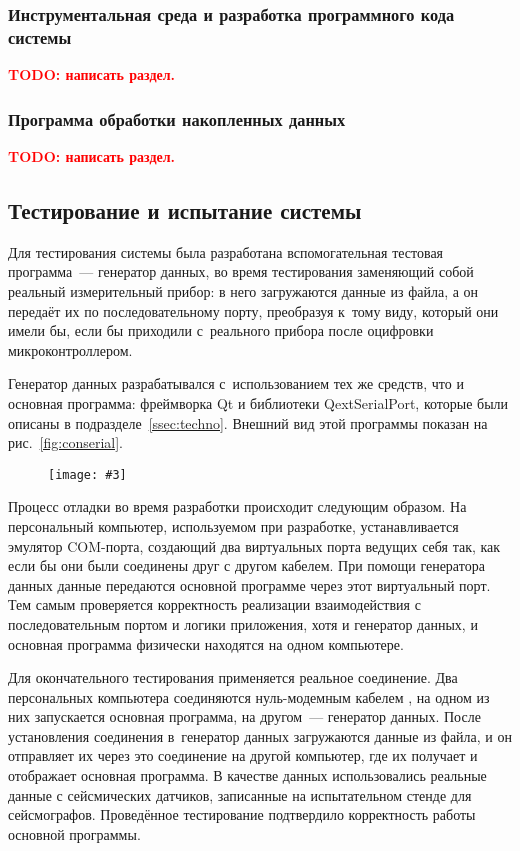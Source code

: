 \documentclass[a4paper, 14pt, titlepage]{extarticle}
\newcommand{\todo}[1]{\textbf{\textcolor{red}{TODO: #1}}}
\newenvironment{myfigure}[2]%
    {\pushQED{\caption{#1} \label{#2}} %
     \begin{figure}[!htb]\centering } %
    {  \popQED %
     \end{figure}}
\newcommand{\includefigure}[3][]{
    \begin{myfigure}{#2}{fig:#3}
      \texttt{[image: \#3]}
    \end{myfigure}
  }
\begin{document}
  \subsubsection{Инструментальная среда и разработка программного кода системы}

  \todo{написать раздел.}

  \subsubsection{Программа обработки накопленных данных}
  
  \todo{написать раздел.}

  \subsection{Тестирование и испытание системы}\label{ssec:testing}

  Для тестирования системы была разработана вспомогательная тестовая программа~--- генератор данных,
  во время тестирования заменяющий собой реальный измерительный прибор: в него загружаются данные из
  файла, а он передаёт их по последовательному порту, преобразуя к~тому виду, который они имели бы,
  если бы приходили с~реального прибора после оцифровки микроконтроллером.

  Генератор данных разрабатывался с~использованием тех же средств, что и основная программа:
  фреймворка Qt и библиотеки QextSerialPort, которые были описаны в подразделе~\ref{ssec:techno}.
  Внешний вид этой программы показан на рис.~\ref{fig:conserial}.

  \includefigure[width=0.4\textwidth]{Тестовая программа~--- генератор данных}{conserial}

  Процесс отладки во время разработки происходит следующим образом. На персональный компьютер,
  используемом при разработке, устанавливается эмулятор COM-порта, создающий два виртуальных порта
  ведущих себя так, как если бы они были соединены друг с другом кабелем. При помощи генератора
  данных данные передаются основной программе через этот виртуальный порт. Тем самым проверяется
  корректность реализации взаимодействия с последовательным портом и логики приложения, хотя и
  генератор данных, и основная программа физически находятся на одном компьютере.

  Для окончательного тестирования применяется реальное соединение. Два персональных компьютера
  соединяются нуль-модемным кабелем \cite{null-modem}, на одном из них запускается основная
  программа, на другом~--- генератор данных. После установления соединения в~генератор данных
  загружаются данные из файла, и он отправляет их через это соединение на другой компьютер, где их
  получает и отображает основная программа. В качестве данных использовались реальные данные с
  сейсмических датчиков, записанные на испытательном стенде для сейсмографов. Проведённое
  тестирование подтвердило корректность работы основной программы.
\end{document}
